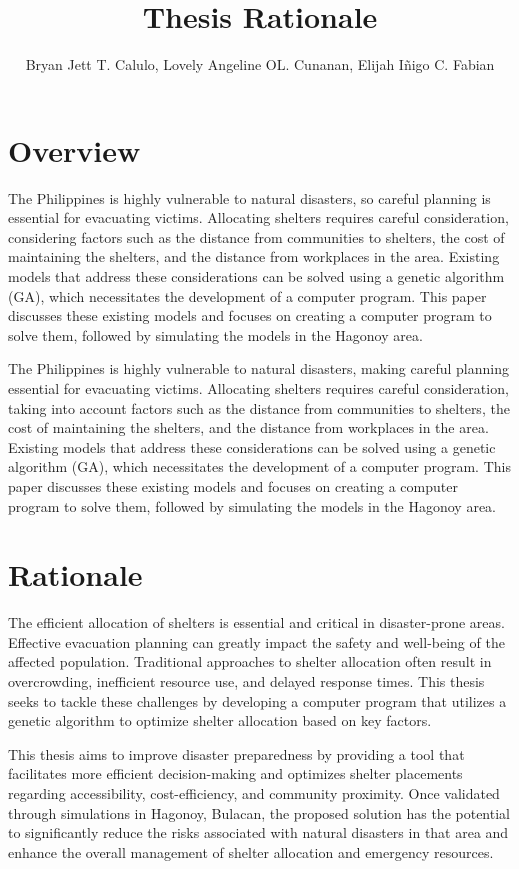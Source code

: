 \documentclass[english,12pt,a4paper]{article}
\title{Thesis Rationale}
\author{Bryan Jett T. Calulo, Lovely Angeline OL. Cunanan, Elijah Iñigo C. Fabian}
\begin{document}
	\maketitle
	
	\section*{Overview}
	The Philippines is highly vulnerable to natural disasters, so careful planning is essential for evacuating victims. Allocating shelters requires careful consideration, considering factors such as the distance from communities to shelters, the cost of maintaining the shelters, and the distance from workplaces in the area. Existing models that address these considerations can be solved using a genetic algorithm (GA), which necessitates the development of a computer program. This paper discusses these existing models and focuses on creating a computer program to solve them, followed by simulating the models in the Hagonoy area.
	
	The Philippines is highly vulnerable to natural disasters, making careful planning essential for evacuating victims. Allocating shelters requires careful consideration, taking into account factors such as the distance from communities to shelters, the cost of maintaining the shelters, and the distance from workplaces in the area. Existing models that address these considerations can be solved using a genetic algorithm (GA), which necessitates the development of a computer program. This paper discusses these existing models and focuses on creating a computer program to solve them, followed by simulating the models in the Hagonoy area.
	
	\section*{Rationale}
	The efficient allocation of shelters is essential and critical in disaster-prone areas. Effective evacuation planning can greatly impact the safety and well-being of the affected population. Traditional approaches to shelter allocation often result in overcrowding, inefficient resource use, and delayed response times. This thesis seeks to tackle these challenges by developing a computer program that utilizes a genetic algorithm to optimize shelter allocation based on key factors.
	
	
	This thesis aims to improve disaster preparedness by providing a tool that facilitates more efficient decision-making and optimizes shelter placements regarding accessibility, cost-efficiency, and community proximity. Once validated through simulations in Hagonoy, Bulacan, the proposed solution has the potential to significantly reduce the risks associated with natural disasters in that area and enhance the overall management of shelter allocation and emergency resources.
	
\end{document}
